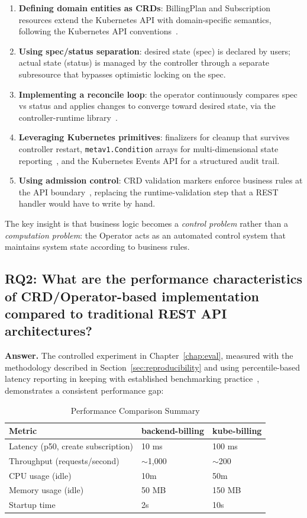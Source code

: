 \begin{enumerate}
    \item \textbf{Defining domain entities as CRDs}: BillingPlan and Subscription resources extend the Kubernetes API with domain-specific semantics, following the Kubernetes API conventions~\cite{k8s_api_conventions, crd_kubernetes}.
    \item \textbf{Using spec/status separation}: desired state (spec) is declared by users; actual state (status) is managed by the controller through a separate subresource that bypasses optimistic locking on the spec.
    \item \textbf{Implementing a reconcile loop}: the operator continuously compares spec vs status and applies changes to converge toward desired state, via the controller-runtime library~\cite{controller_runtime, kubebuilder}.
    \item \textbf{Leveraging Kubernetes primitives}: finalizers for cleanup that survives controller restart, \texttt{metav1.Condition} arrays for multi-dimensional state reporting~\cite{k8s_api_conventions}, and the Kubernetes Events API for a structured audit trail.
    \item \textbf{Using admission control}: CRD validation markers enforce business rules at the API boundary~\cite{crd_features}, replacing the runtime-validation step that a REST handler would have to write by hand.
\end{enumerate}

The key insight is that business logic becomes a \textit{control problem} rather than a \textit{computation problem}: the Operator acts as an automated control system that maintains system state according to business rules.

\subsection{RQ2: What are the performance characteristics of CRD/Operator-based implementation compared to traditional REST API architectures?}

\textbf{Answer.} The controlled experiment in Chapter~\ref{chap:eval}, measured with the methodology described in Section~\ref{sec:reproducibility} and using percentile-based latency reporting in keeping with established benchmarking practice~\cite{tene_latency, hdrhistogram}, demonstrates a consistent performance gap:

\begin{table}[h]
\centering
\caption{Performance Comparison Summary}
\small\begin{tabularx}{\textwidth}{@{}lXX@{}}
\toprule
\textbf{Metric} & \textbf{backend-billing} & \textbf{kube-billing} \\ \midrule
Latency (p50, create subscription) & 10 ms & 100 ms \\
Throughput (requests/second) & $\sim$1,000 & $\sim$200 \\
CPU usage (idle) & 10m & 50m \\
Memory usage (idle) & 50 MB & 150 MB \\
Startup time & 2s & 10s \\ \bottomrule
\end{tabularx}
\end{table}

